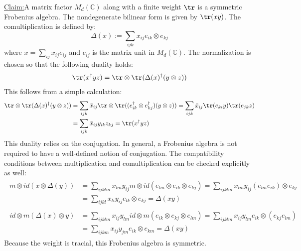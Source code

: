 \documentclass[a4paper,11pt]{article}
\theoremstyle{definition}
\numberwithin{equation}{section}
\newenvironment{claim}[1]{\par\noindent\underline{Claim:}\space#1}{}
\begin{document}
\begin{claim}
    A matrix factor $M_d(\mathbb{C})$ along with a finite weight $\tr$ is a symmetric Frobenius algebra. The nondegenerate bilinear form is given by $\tr(xy)$. The comultiplication is defined by:
    \begin{equation}
        \Delta(x) := \sum_{ijk}x_{ij}e_{ik}\otimes e_{kj}
    \end{equation}
    where $x = \sum_{ij}x_{ij}e_{ij}$ and $e_{ij}$ is the matrix unit in $M_d(\mathbb{C})$. The normalization is chosen so that the following duality holds:
    \begin{equation}
        \tr(x^\dagger yz) = \tr\otimes\tr(\Delta(x)^\dagger(y\otimes z))
    \end{equation}
    This follows from a simple calculation:
    \begin{align}
        \begin{split}
            \tr\otimes\tr(\Delta(x)^\dagger(y\otimes z)) &= \sum_{ijk}\bar{x}_{ij}\tr\otimes\tr((e^\dagger_{ik}\otimes e^\dagger_{kj})(y\otimes z)) = \sum_{ijk}\bar{x}_{ij}\tr(e_{ki}y)\tr(e_{jk}z)\\&=\sum_{ijk}\bar{x}_{ij}y_{ik}z_{kj} = \tr(x^\dagger yz)
        \end{split}
    \end{align}
    This duality relies on the conjugation. In general, a Frobenius algebra is not required to have a well-defined notion of conjugation. The compatibility conditions between multiplication and comultiplication can be checked explicitly as well:
    \begin{align}
        \begin{split}
            m\otimes id(x\otimes \Delta(y)) &= \sum_{ijklm}x_{lm}y_{ij}m\otimes id(e_{lm}\otimes e_{ik}\otimes e_{kj})
            =\sum_{ijklm}x_{lm}y_{ij}(e_{lm}e_{ik})\otimes e_{kj}
            \\
            &=\sum_{ijkl}x_{li}y_{ij}e_{lk}\otimes e_{kj} = \Delta(xy)
        \end{split}
    \end{align}
    \begin{align}
        \begin{split}
            id\otimes m(\Delta(x)\otimes y) &= \sum_{ijklm}x_{ij}y_{lm}id\otimes m(e_{ik}\otimes e_{kj}\otimes e_{lm})
            =\sum_{ijklm}x_{ij}y_{lm}e_{ik}\otimes(e_{kj}e_{lm}
            )
            \\
            &=\sum_{ijkm}x_{ij}y_{jm}e_{ik}\otimes e_{km} = \Delta(xy)
        \end{split}
    \end{align}
    Because the weight is tracial, this Frobenius algebra is symmetric.


\end{claim}
\end{document}
